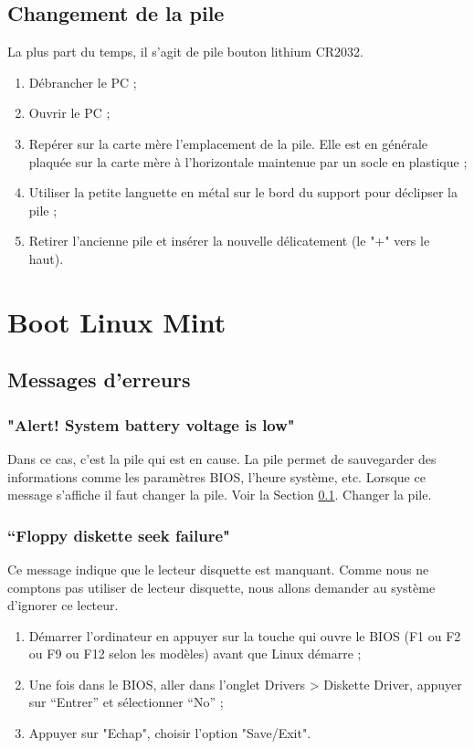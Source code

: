 \documentclass[12pt]{article}
\begin{document}
    \subsection{Changement de la pile}\label{sec:changementpile}
        La plus part du temps, il s'agit de pile bouton lithium CR2032.
        \begin{enumerate}
            \item Débrancher le PC ;
            \item Ouvrir le PC ;
            \item Repérer sur la carte mère l'emplacement de la pile. Elle est en générale plaquée sur la carte mère à l'horizontale maintenue par un socle en plastique ;
            \item Utiliser la petite languette en métal sur le bord du support pour déclipser la pile ;
            \item Retirer l'ancienne pile et insérer la nouvelle délicatement (le "+" vers le haut).
        \end{enumerate}

\section{Boot Linux Mint}
    \subsection{Messages d'erreurs}
        \subsubsection{"Alert! System battery voltage is low"}
            Dans ce cas, c'est la pile qui est en cause. La pile permet de sauvegarder des informations comme les paramètres BIOS, l'heure système, etc. Lorsque ce message s'affiche il faut changer la pile. Voir la Section \ref{sec:changementpile}. Changer la pile.
        \subsubsection{“Floppy diskette seek failure"}
            Ce message indique que le lecteur disquette est manquant. Comme nous ne comptons pas utiliser de lecteur disquette, nous allons demander au système d’ignorer ce lecteur.
            \begin{enumerate}
                \item Démarrer l’ordinateur en appuyer sur la touche qui ouvre le BIOS (F1 ou F2 ou F9 ou F12 selon les modèles) avant que Linux démarre ;
                \item Une fois dans le BIOS, aller dans l’onglet Drivers > Diskette Driver, appuyer sur “Entrer” et sélectionner “No” ;
                \item Appuyer sur "Echap", choisir l'option "Save/Exit".
            \end{enumerate}
\end{document}
